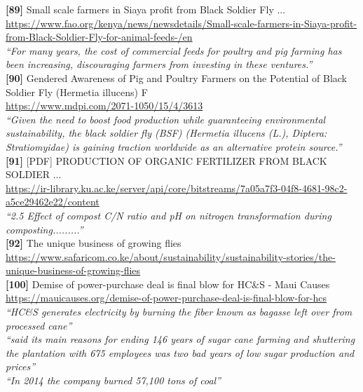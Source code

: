 \textbf{[89]} Small scale farmers in Siaya profit from Black Soldier Fly ...\\[0.15em]
\url{https://www.fao.org/kenya/news/newsdetails/Small-scale-farmers-in-Siaya-profit-from-Black-Soldier-Fly-for-animal-feeds-/en}\\[0.2em]
\emph{``For many years, the cost of commercial feeds for poultry and pig farming has been increasing, discouraging farmers from investing in these ventures.''}\\[0.45em]

\textbf{[90]} Gendered Awareness of Pig and Poultry Farmers on the Potential of Black Soldier Fly (Hermetia illucens) F\\[0.15em]
\url{https://www.mdpi.com/2071-1050/15/4/3613}\\[0.2em]
\emph{``Given the need to boost food production while guaranteeing environmental sustainability, the black soldier fly (BSF) (Hermetia illucens (L.), Diptera: Stratiomyidae) is gaining traction worldwide as an alternative protein source.''}\\[0.45em]

\textbf{[91]} [PDF] PRODUCTION OF ORGANIC FERTILIZER FROM BLACK SOLDIER ...\\[0.15em]
\url{https://ir-library.ku.ac.ke/server/api/core/bitstreams/7a05a7f3-04f8-4681-98c2-a5ce29462e22/content}\\[0.2em]
\emph{``2.5 Effect of compost C/N ratio and pH on nitrogen transformation during composting.........''}\\[0.45em]

\textbf{[92]} The unique business of growing flies\\[0.15em]
\url{https://www.safaricom.co.ke/about/sustainability/sustainability-stories/the-unique-business-of-growing-flies}\\[0.2em]

\textbf{[100]} Demise of power-purchase deal is final blow for HC\&S - Maui Causes\\[0.15em]
\url{https://mauicauses.org/demise-of-power-purchase-deal-is-final-blow-for-hcs}\\[0.2em]
\emph{``HC\&S generates electricity by burning the fiber known as bagasse left over from processed cane''}\\[0.45em]
\emph{``said its main reasons for ending 146 years of sugar cane farming and shuttering the plantation with 675 employees was two bad years of low sugar production and prices''}\\[0.45em]
\emph{``In 2014 the company burned 57,100 tons of coal''}\\[0.45em]

